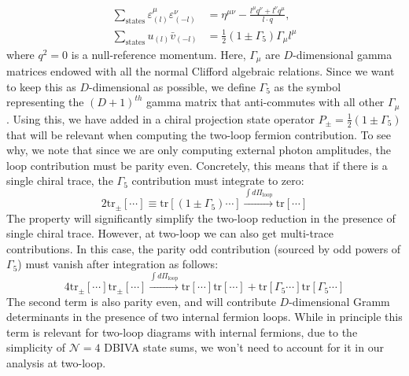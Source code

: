 \documentclass[11pt,letter]{article}
\begin{document}
\begin{align}
\sum_{\text{states}}\varepsilon^\mu_{(l)}\varepsilon^\nu_{(-l)} &= \eta^{\mu\nu} - \frac{l^\mu q^\nu+l^\nu q^\mu}{l\cdot q},
\\
\sum_{\text{states}}u_{(l)}\bar{v}_{(-l)} &= \frac{1}{2}(1\pm \Gamma_5)\Gamma_\mu l^\mu 
\end{align}
where $q^2=0$ is a null-reference momentum. Here, $\Gamma_\mu$ are $D$-dimensional gamma matrices endowed with all the normal Clifford algebraic relations. Since we want to keep this as $D$-dimensional as possible, we define $\Gamma_5$ as the symbol representing the $(D+1)^{th}$ gamma matrix that anti-commutes with all other $\Gamma_\mu$. Using this, we have added in a chiral projection state operator $P_{\pm}=\frac{1}{2}(1\pm \Gamma_5)$ that will be relevant when computing the two-loop fermion contribution. To see why, we note that since we are only computing external photon amplitudes, the loop contribution must be {parity even}. Concretely, this means that if there is a single chiral trace, the $\Gamma_5$ contribution must integrate to zero:
\begin{equation}
2\text{tr}_{\pm}[\cdots] \equiv \text{tr}[(1\pm \Gamma_5)\cdots]  \xrightarrow{\int d\Pi_{\text{loop}}} \text{tr}[\cdots]
\end{equation}
The property will significantly simplify the two-loop reduction in the presence of {single} chiral trace. However, at two-loop we can also get multi-trace contributions. In this case, the parity odd contribution (sourced by odd powers of $\Gamma_5$) must vanish after integration as follows:
\begin{equation}
4\text{tr}_{\pm}[\cdots] \text{tr}_{\pm}[\cdots]  \xrightarrow{\int d\Pi_{\text{loop}}} \text{tr}[\cdots]\text{tr}[\cdots]+\text{tr}[\Gamma_5\cdots]\text{tr}[\Gamma_5\cdots]
\end{equation}
The second term is also parity even, and will contribute $D$-dimensional Gramm determinants in the presence of two internal fermion loops. While in principle this term is relevant for two-loop diagrams with internal fermions, due to the simplicity of $\mathcal{N}=4$ DBIVA state sums, we won't need to account for it in our analysis at two-loop. 
\end{document}
